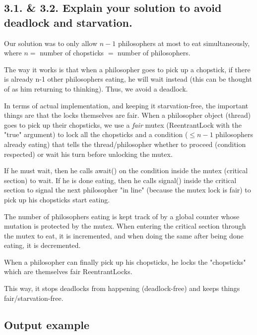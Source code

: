 \documentclass[11pt,letterpaper]{exam}
\begin{document}
\begin{questions}
		\subsection*{3.1. \& 3.2. Explain your solution to avoid deadlock and starvation.}
		Our solution was to only allow $n-1$ philosophers at most to eat simultaneously, where $n =$ number of chopsticks $=$ number of philosophers.

		The way it works is that when a philosopher goes to pick up a chopstick, if there is already n-1 other philosophers eating, he will wait instead (this can be thought of as him returning to thinking). Thus, we avoid a deadlock.

		In terms of actual implementation, and keeping it starvation-free, the important things are that the locks themselves are fair. When a philosopher object (thread) goes to pick up their chopsticks, we use a \textit{fair} mutex (ReentrantLock with the "true" argument) to lock all the chopsticks and a condition ($\le n-1$ philosophers already eating) that tells the thread/philosopher whether to proceed (condition respected) or wait his turn before unlocking the mutex.

		If he must wait, then he calls await() on the condition inside the mutex (critical section) to wait.
		If he is done eating, then he calls signal() inside the critical section to signal the next philosopher "in line" (because the mutex lock is fair) to pick up his chopsticks start eating.

		The number of philosophers eating is kept track of by a global counter whose mutation is protected by the mutex.
		When entering the critical section through the mutex to eat, it is incremented, and when doing the same after being done eating, it is decremented.

		When a philosopher can finally pick up his chopsticks, he locks the "chopsticks" which are themselves fair ReentrantLocks.

		This way, it stops deadlocks from happening (deadlock-free) and keeps things fair/starvation-free.

		\subsection*{Output example}


\end{questions}
\end{document}
